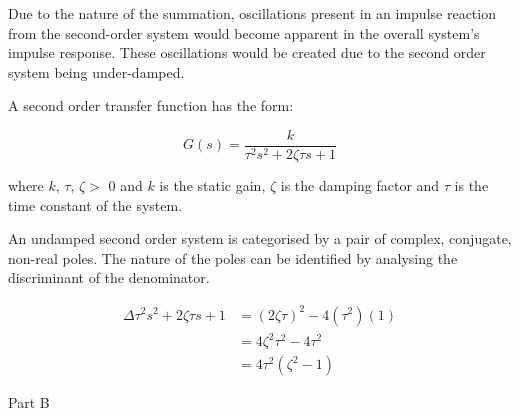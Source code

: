 \documentclass[a4paper,10pt,reqno]{amsart}
\makeatletter
\def\section{\@startsection{section}{1}%
  \z@{.7\linespacing\@plus\linespacing}{.5\linespacing}%
  {\bfseries\scshape\centering}}
\numberwithin{equation}{section}
\makeatother
\begin{document}
\par Due to the nature of the summation, oscillations present in an impulse reaction from the second-order system would become apparent in the overall system's impulse response. These oscillations would be created due to the second order system being under-damped.
\\
\par A second order transfer function has the form:

\begin{equation}
    G(s) = \frac{k}{\tau^2s^2+2\zeta\tau s+1}
\end{equation}

\par where $k$, $\tau$, $\zeta >$ 0 and $k$ is the static gain, $\zeta$ is the damping factor and $\tau$ is the time constant of the system.
\par An undamped second order system is categorised by a pair of complex, conjugate, non-real poles. The nature of the poles can be identified by analysing the discriminant of the denominator.

\begin{align*}
    \Delta\tau^2s^2+2\zeta\tau s+1&=(2\zeta\tau)^2 - 4(\tau^2)(1)
    \\
    &=4\zeta^2\tau^2-4\tau^2
    \\
    &=4\tau^2(\zeta^2-1)
\end{align*}

\section{Part B}

\begin{lstlisting}[language=python]

\end{lstlisting}
\end{document}

